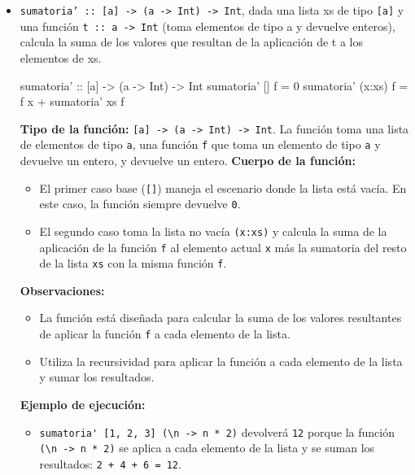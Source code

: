 \documentclass{article}
\begin{document}
\begin{itemize}
    \item 
\verb|sumatoria’ :: [a] -> (a -> Int) -> Int|, dada una lista xs de tipo \verb|[a]| y una función \verb|t :: a -> Int| (toma elementos de tipo a y devuelve enteros), calcula la suma de los valores que resultan de la aplicación de t a los elementos de xs.
\begin{haskell}
sumatoria' :: [a] -> (a -> Int) -> Int
sumatoria' [] f = 0
sumatoria' (x:xs) f = f x + sumatoria' xs f
\end{haskell}
\textbf{Tipo de la función:} \verb|[a] -> (a -> Int) -> Int|. La función toma una lista de elementos de tipo \verb|a|, una función \verb|f| que toma un elemento de tipo \verb|a| y devuelve un entero, y devuelve un entero.
\textbf{Cuerpo de la función:}
\begin{itemize}
\item El primer caso base (\verb|[]|) maneja el escenario donde la lista está vacía. En este caso, la función siempre devuelve \verb|0|.
\item El segundo caso toma la lista no vacía \verb|(x:xs)| y calcula la suma de la aplicación de la función \verb|f| al elemento actual \verb|x| más la sumatoria del resto de la lista \verb|xs| con la misma función \verb|f|.
\end{itemize}
\textbf{Observaciones:}
\begin{itemize}
\item La función está diseñada para calcular la suma de los valores resultantes de aplicar la función \verb|f| a cada elemento de la lista.
\item Utiliza la recursividad para aplicar la función a cada elemento de la lista y sumar los resultados.
\end{itemize} 
\textbf{Ejemplo de ejecución:}
\begin{itemize}
\item \verb|sumatoria' [1, 2, 3] (\n -> n * 2)| devolverá \verb|12| porque la función \verb|(\n -> n * 2)| se aplica a cada elemento de la lista y se suman los resultados: \verb|2 + 4 + 6 = 12|.
\end{itemize}


\end{itemize}
\end{document}
